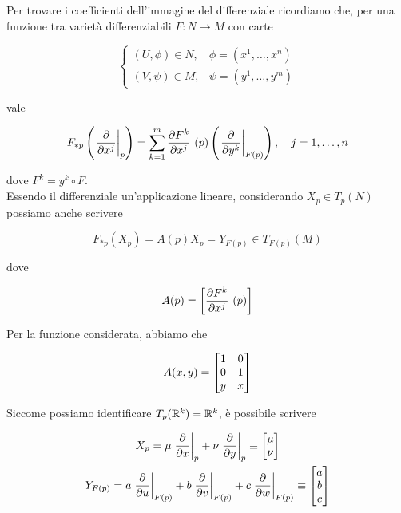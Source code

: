 Per trovare i coefficienti dell'immagine del differenziale ricordiamo che, per una funzione tra varietà differenziabili $ F : N \to M $ con carte

\begin{equation}
	\begin{cases}
		(U,\phi) \in N, & \phi = (x^{1},\dots,x^{n})\\
		(V,\psi) \in M, & \psi = (y^{1},\dots,y^{m})
	\end{cases}
\end{equation}

vale

\begin{equation}
	F_{*p} \left( \eval{\pdv{x^{j}}}_{p} \right) = \sum_{k=1}^{m} \pdv{F^{k}}{x^{j}}\ (p) \left( \eval{\pdv{y^{k}}}_{F(p)} \right) \qcomma j = 1,\dots,n
\end{equation}

dove $ F^{k} = y^{k} \circ F $.\\
Essendo il differenziale un'applicazione lineare, considerando $ X_{p} \in T_{p}(N) $ possiamo anche scrivere

\begin{equation}
	F_{*p} (X_{p}) = A(p) X_{p} = Y_{F(p)} \in T_{F(p)}(M)
\end{equation}

dove

\begin{equation}
	A(p) = \left[ \pdv{F^{k}}{x^{j}}\ (p) \right]
\end{equation}

Per la funzione considerata, abbiamo che

\begin{equation}
	A(x,y) = \bmqty{ 1 & 0 \\ 0 & 1 \\ y & x }
\end{equation}

Siccome possiamo identificare $ T_{p}(\mathbb{R}^{k}) = \mathbb{R}^{k} $, è possibile scrivere

\begin{gather}
	X_{p} = \mu \eval{\pdv{x}}_{p} + \nu \eval{\pdv{y}}_{p} \equiv \bmqty{ \mu \\ \nu }\\
	Y_{F(p)} = a \eval{\pdv{u}}_{F(p)} + b \eval{\pdv{v}}_{F(p)} + c \eval{\pdv{w}}_{F(p)} \equiv \bmqty{ a \\ b \\ c }
\end{gather}

